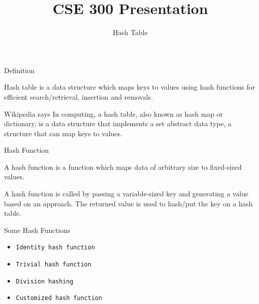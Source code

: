 \documentclass{beamer}
\title{CSE 300 Presentation}
\subtitle{Hash Table}
\date{}
\author[Abdus Samee \& Tamim Ehsan]
{%
   \texorpdfstring{
        \begin{columns}
            \column{.45\linewidth}
            \centering
            \RBox{Abdus Samee\\
            \texttt{1805021}
            }
            \column{.45\linewidth}
            \centering
            \RBox{Tamim Ehsan\\
            \texttt{1805022}
            }
        \end{columns}
   }
   {John Doe \& Jane Doe}
}
\begin{document}
\maketitle

\begin{frame}{Definition}
    \begin{block}{}
      \centering
      Hash table is a data structure which maps keys to values using hash functions for efficient search/retrieval, insertion and removals.  
    \end{block}
    
    \begin{block}{Wikipedia says}
        \centering
        In computing, a hash table, also known as hash map or dictionary, is a data structure that implements a set abstract data type, a structure that can map keys to values.  
    \end{block}  
\end{frame}

\begin{frame}{Hash Function}
    \begin{definition}
        A hash function is a function which maps data of arbitrary size to fixed-sized values.
    \end{definition}

    \begin{block}{}
        A hash function is called by passing a variable-sized key and generating a value based on an approach. The returned value is used to hash/put the key on a hash table.
    \end{block}
\end{frame}

\begin{frame}{Some Hash Functions}
    \begin{itemize}
        \item \texttt{Identity hash function} \pause
        \item \texttt{Trivial hash function} \pause
        \item \texttt{Division hashing} \pause
        \item \texttt{Customized hash function}
    \end{itemize}
\end{frame}
\end{document}
